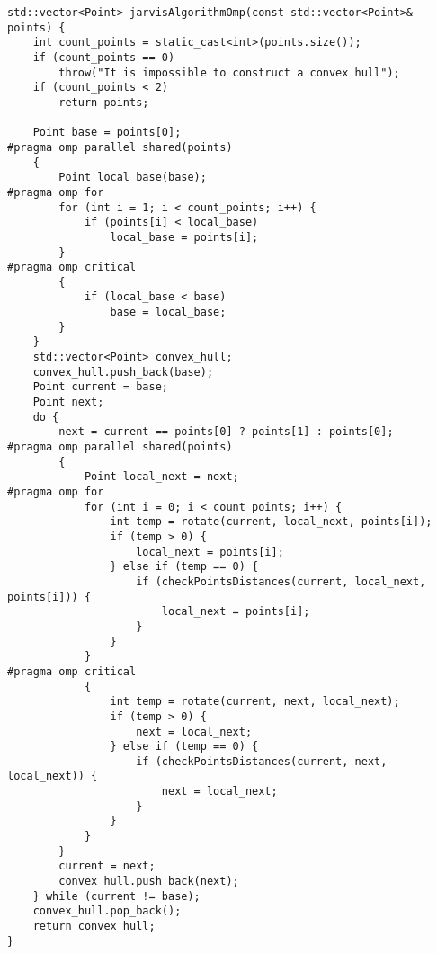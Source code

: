 \documentclass{report}
\begin{document}
\begin{lstlisting}
std::vector<Point> jarvisAlgorithmOmp(const std::vector<Point>& points) {
    int count_points = static_cast<int>(points.size());
    if (count_points == 0)
        throw("It is impossible to construct a convex hull");
    if (count_points < 2)
        return points;

    Point base = points[0];
#pragma omp parallel shared(points)
    {
        Point local_base(base);
#pragma omp for
        for (int i = 1; i < count_points; i++) {
            if (points[i] < local_base)
                local_base = points[i];
        }
#pragma omp critical
        {
            if (local_base < base)
                base = local_base;
        }
    }
    std::vector<Point> convex_hull;
    convex_hull.push_back(base);
    Point current = base;
    Point next;
    do {
        next = current == points[0] ? points[1] : points[0];
#pragma omp parallel shared(points)
        {
            Point local_next = next;
#pragma omp for
            for (int i = 0; i < count_points; i++) {
                int temp = rotate(current, local_next, points[i]);
                if (temp > 0) {
                    local_next = points[i];
                } else if (temp == 0) {
                    if (checkPointsDistances(current, local_next, points[i])) {
                        local_next = points[i];
                    }
                }
            }
#pragma omp critical
            {
                int temp = rotate(current, next, local_next);
                if (temp > 0) {
                    next = local_next;
                } else if (temp == 0) {
                    if (checkPointsDistances(current, next, local_next)) {
                        next = local_next;
                    }
                }
            }
        }
        current = next;
        convex_hull.push_back(next);
    } while (current != base);
    convex_hull.pop_back();
    return convex_hull;
}
\end{lstlisting}
\end{document}

